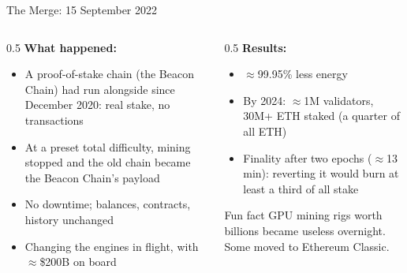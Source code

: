 \ifdefined\PRESENTATION\else\PassOptionsToClass{handout}{beamer}\fi\documentclass[aspectratio=169, lualatex]{beamer}
\begin{document}
\begin{frame}{The Merge: 15 September 2022}
	\begin{columns}[c]
		\begin{column}{0.5\textwidth}
			\textbf{What happened:}
			\begin{itemize}
				\item A proof-of-stake chain (the Beacon Chain) had run alongside since December 2020: real stake, no transactions
				\item At a preset total difficulty, mining stopped and the old chain became the Beacon Chain's payload
				\item No downtime; balances, contracts, history unchanged
				\item Changing the engines in flight, with $\approx$\$200B on board
			\end{itemize}
		\end{column}
		\begin{column}{0.5\textwidth}
			\textbf{Results:}
			\begin{itemize}
				\item $\approx$99.95\% less energy
				\item By 2024: $\approx$1M validators, 30M+ ETH staked (a quarter of all ETH)
				\item Finality after two epochs ($\approx$13 min): reverting it would burn at least a third of all stake
			\end{itemize}
			\begin{exampleblock}{Fun fact}
				GPU mining rigs worth billions became useless overnight. Some moved to Ethereum Classic.
			\end{exampleblock}
		\end{column}
	\end{columns}
\end{frame}
\end{document}
